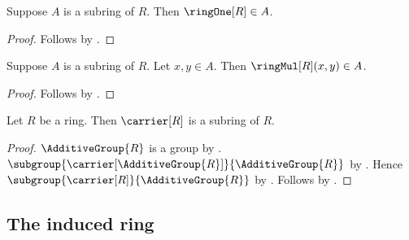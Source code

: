 \begin{proposition}\label{subring_one}
    Suppose $A$ is a subring of $R$.
    Then $\ringOne[R]\in A$.
\end{proposition}
\begin{proof}
    Follows by .
\end{proof}

\begin{proposition}\label{subring_mul}
    Suppose $A$ is a subring of $R$.
    Let $x,y\in A$.
    Then $\ringMul[R](x,y)\in A$.
\end{proposition}
\begin{proof}
    Follows by .
\end{proof}

\begin{proposition}\label{full_carrier_subring}
    Let $R$ be a ring.
    Then $\carrier[R]$ is a subring of $R$.
\end{proposition}
\begin{proof}
    $\AdditiveGroup{R}$ is a group by
        .
    $\subgroup{\carrier[\AdditiveGroup{R}]}{\AdditiveGroup{R}}$ by
        .
    Hence $\subgroup{\carrier[R]}{\AdditiveGroup{R}}$ by
        .
    Follows by .
\end{proof}

\subsection{The induced ring}

